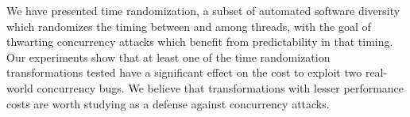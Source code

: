 We have presented time randomization, a subset of automated software diversity which randomizes the timing between and among threads, with the goal of thwarting concurrency attacks which benefit from predictability in that timing.
Our experiments show that at least one of the time randomization transformations tested have a significant effect on the cost to exploit two real-world concurrency bugs.
We believe that transformations with lesser performance costs are worth studying as a defense against concurrency attacks.